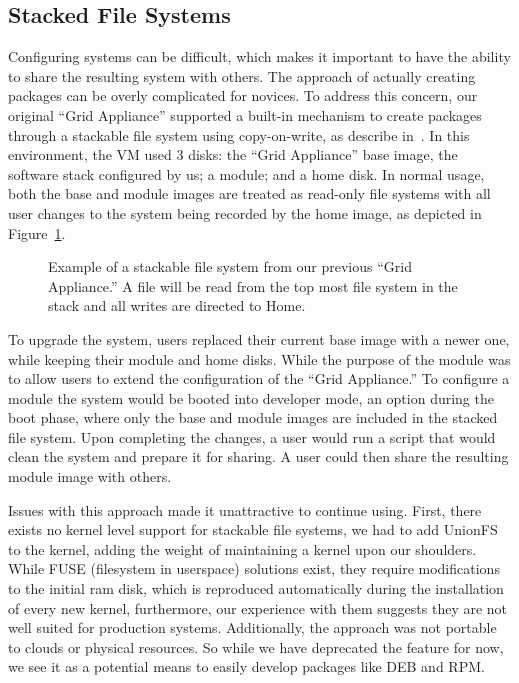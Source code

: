\documentclass[twocolumn]{svjour3}
\begin{document}
\subsection{Stacked File Systems}

Configuring systems can be difficult, which makes it important to have the
ability to share the resulting system with others.  The approach of actually
creating packages can be overly complicated for novices.  To address this
concern, our original ``Grid Appliance'' supported a built-in mechanism to
create packages through a stackable file system using copy-on-write, as
describe in~\cite{vtdc}.  In this environment, the VM used 3 disks: the ``Grid
Appliance'' base image, the software stack configured by us; a module; and a
home disk.  In normal usage, both the base and module images are treated as
read-only file systems with all user changes to the system being recorded by
the home image, as depicted in Figure~\ref{fig:stackfs}.

\begin{figure}[ht]
\centering
{}
\caption{Example of a stackable file system from our previous ``Grid
Appliance.''  A file will be read from the top most file system in the stack
and all writes are directed to Home.}
\label{fig:stackfs}
\end{figure}

To upgrade the system, users replaced their current base image with a newer
one, while keeping their module and home disks.  While the purpose of the
module was to allow users to extend the configuration of the ``Grid
Appliance.''  To configure a module the system would be booted into developer
mode, an option during the boot phase, where only the base and module images
are included in the stacked file system.  Upon completing the changes, a user
would run a script that would clean the system and prepare it for sharing.  A
user could then share the resulting module image with others.

Issues with this approach made it unattractive to continue using.  First, there
exists no kernel level support for stackable file systems, we had to add
UnionFS~\cite{unionfs} to the kernel, adding the weight of maintaining a kernel
upon our shoulders.  While FUSE (filesystem in userspace) solutions exist, they
require modifications to the initial ram disk, which is reproduced
automatically during the installation of every new kernel, furthermore, our
experience with them suggests they are not well suited for production systems.
Additionally, the approach was not portable to clouds or physical resources.
So while we have deprecated the feature for now, we see it as a potential means
to easily develop packages like DEB and RPM.
\end{document}
